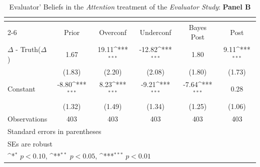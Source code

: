\begin{table}[htbp]\centering
\def\sym#1{\ifmmode^{#1}\else\(^{#1}\)\fi}
\caption{Evaluator' Beliefs in the \textit{Attention} treatment of the \textit{Evaluator Study}: \textbf{Panel B}}
\begin{tabular}{l*{5}{c}}
\hline\hline
                &\multicolumn{5}{c}{}                                                                          \\\cmidrule(lr){2-6}
                &\multicolumn{1}{c}{Prior}&\multicolumn{1}{c}{Overconf}&\multicolumn{1}{c}{Underconf}&\multicolumn{1}{c}{Bayes Post}&\multicolumn{1}{c}{Post}\\
\hline
$\Delta$ - Truth($\Delta$)&     1.67         &    19.11\sym{***}&   -12.82\sym{***}&     1.80         &     9.11\sym{***}\\
                &   (1.83)         &   (2.20)         &   (2.08)         &   (1.80)         &   (1.73)         \\
Constant        &    -8.80\sym{***}&     8.23\sym{***}&    -9.21\sym{***}&    -7.64\sym{***}&     0.28         \\
                &   (1.32)         &   (1.49)         &   (1.34)         &   (1.25)         &   (1.06)         \\
\hline
Observations    &      403         &      403         &      403         &      403         &      403         \\
\hline\hline
\multicolumn{6}{l}{\footnotesize Standard errors in parentheses}\\
\multicolumn{6}{l}{\footnotesize SEs are robust}\\
\multicolumn{6}{l}{\footnotesize \sym{*} \(p<0.10\), \sym{**} \(p<0.05\), \sym{***} \(p<0.01\)}\\
\end{tabular}
\end{table}
